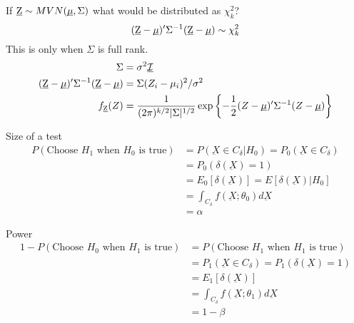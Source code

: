 \documentclass[avery5388,grid,frame]{flashcards}
\begin{document}
\begin{flashcard}{If $\underbar{Z}\sim MVN(\underbar{$\mu$},\Sigma)$ what would be distributed as $\chi^2_k$?}
\bigskip\bigskip\bigskip
\begin{equation*}
(\underbar{Z}-\underbar{$\mu$})'\Sigma^{-1}(\underbar{Z}-\underbar{$\mu$})\sim \chi^2_k
\end{equation*}
This is only when $\Sigma$ is full rank.
{\begin{align*}
\Sigma&=\sigma^2\underbar{$\mathcal{I}$}\\
(\underbar{Z}-\underbar{$\mu$})'\Sigma^{-1}(\underbar{Z}-\underbar{$\mu$})&=\Sigma(Z_i-\mu_i)^2/\sigma^2\\
f_{\underbar{z}}(Z)&=\frac{1}{(2\pi)^{k/2}|\Sigma|^{1/2}}\exp\left\{-\frac{1}{2}(Z-\underbar{$\mu$})'\Sigma^{-1}(Z-\underbar{$\mu$})\right\}
\end{align*}}
\end{flashcard}
\begin{flashcard}[Definition]{Size of a test}
\bigskip\bigskip
{\begin{align*}
P(\textrm{Choose $H_1$ when $H_0$ is true})&=P(\underbar{X}\in C_\delta|H_0)=P_0(\underbar{X}\in C_\delta)\\
&=P_0(\delta(\underbar{X})=1)\\
&=E_0[\delta(\underbar{X})]=E[\delta(\underbar{X})|H_0]\\
&=\int_{C_\delta}f(\underbar{X};\theta_0)d\underbar{X}\\
&=\alpha
\end{align*}}
\end{flashcard}
\begin{flashcard}[Definition]{Power}
\bigskip\bigskip
{\begin{align*}
1-P(\textrm{Choose $H_0$ when $H_1$ is true})&=P(\textrm{Choose $H_1$ when $H_1$ is true})\\
&=P_1(\underbar{X}\in C_\delta)=P_1(\delta(\underbar{X})=1)\\
&=E_1[\delta(\underbar{X})]\\
&=\int_{C_\delta}f(\underbar{X};\theta_1)d\underbar{X}\\
&=1-\beta
\end{align*}}
\end{flashcard}
\end{document}
